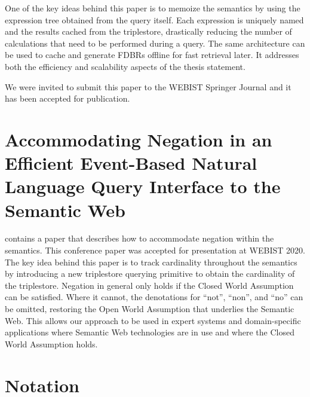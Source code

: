 \documentclass[../main.tex]{subfiles}
\begin{document}
\begin{refsection}
One of the key ideas behind this paper is to memoize the semantics by using the expression tree obtained from the query itself.  Each expression is uniquely named and the results cached from the triplestore, drastically reducing the number of calculations that need to be performed during a query.  The same architecture can be used to cache and generate FDBRs offline for fast retrieval later.  It addresses both the efficiency and scalability aspects of the thesis statement.


We were invited to submit this paper to the WEBIST Springer Journal and it has been accepted for publication.

\section{Accommodating Negation in an Efficient Event-Based Natural Language Query Interface to the Semantic Web}

\textbf{} contains a paper that describes how to accommodate negation
within the semantics.  This conference paper was accepted for presentation at WEBIST 2020.
The key idea behind this paper is to track cardinality throughout the semantics by introducing
a new triplestore querying primitive to obtain the cardinality of the triplestore.  Negation
in general only holds if the Closed World Assumption can be satisfied.  Where it cannot, the
denotations for ``not'', ``non'', and ``no'' can be omitted, restoring the Open World Assumption
that underlies the Semantic Web.  This allows our approach to be used in expert systems and domain-specific applications where Semantic Web technologies are in use and where the Closed World Assumption holds.

\section{Notation}


\end{refsection}
\end{document}
